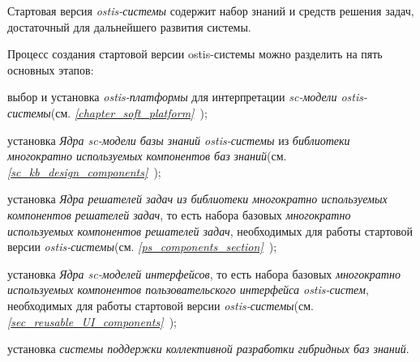 Стартовая версия \textit{ostis-системы} содержит набор знаний и средств решения задач, достаточный для дальнейшего развития системы.

Процесс создания стартовой версии ostis-системы можно разделить на пять основных этапов:
\begin{textitemize}
\item выбор и установка \textit{ostis-платформы} для интерпретации \textit{sc-модели ostis-системы}(см. \textit{\ref{chapter_soft_platform}~});

\item установка \textit{Ядра sc-модели базы знаний ostis-системы} из \textit{библиотеки многократно используемых компонентов баз знаний}(см. \textit{\ref{sc_kb_design_components}~});

\item установка \textit{Ядра решателей задач из библиотеки многократно используемых компонентов решателей задач}, то есть набора базовых \textit{многократно используемых компонентов решателей задач}, необходимых для работы стартовой версии \textit{ostis-системы}(см. \textit{\ref{ps_components_section}~});

\item установка \textit{Ядра sc-моделей интерфейсов}, то есть набора базовых \textit{многократно используемых компонентов пользовательского интерфейса ostis-систем}, необходимых для работы стартовой версии \textit{ostis-системы}(см. \textit{\ref{sec_reusable_UI_components}~});

\item установка \textit{системы поддержки коллективной разработки гибридных баз знаний}.
\end{textitemize}

